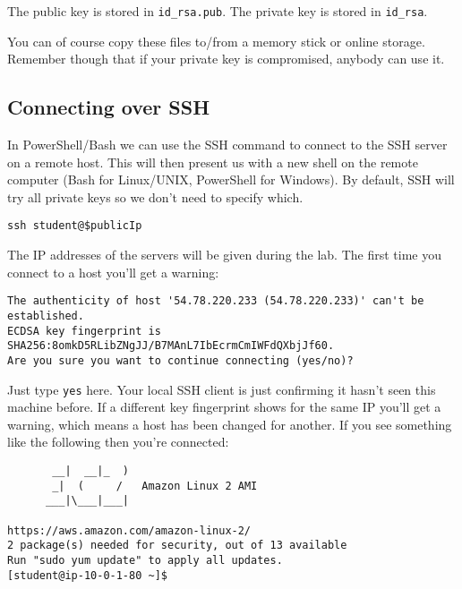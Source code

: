 \documentclass{pgnotes}
\begin{document}
The public key is stored in \texttt{id\_rsa.pub}.
The private key is stored in \texttt{id\_rsa}.

You can of course copy these files to/from a memory stick or online storage.
Remember though that if your private key is compromised,
anybody can use it.

\subsection{Connecting over SSH}
\label{connecting-over-ssh}

In PowerShell/Bash we can use the SSH command to connect to the SSH server on a remote host.
This will then present us with a new shell on the remote computer (Bash for Linux/UNIX, PowerShell for Windows).
By default, SSH will try all private keys so we don't need to specify which.

\begin{verbatim}
ssh student@$publicIp 
\end{verbatim}

The IP addresses of the servers will be given during the lab.
The first time you connect to a host you'll get a warning:

\begin{verbatim}
The authenticity of host '54.78.220.233 (54.78.220.233)' can't be established.
ECDSA key fingerprint is SHA256:8omkD5RLibZNgJJ/B7MAnL7IbEcrmCmIWFdQXbjJf60.
Are you sure you want to continue connecting (yes/no)?
\end{verbatim}

Just type \texttt{yes} here.
Your local SSH client is just confirming it hasn't seen this machine before.
If a different key fingerprint shows for the same IP you'll get a warning, which means a host has been changed for another.
If you see something like the following then you're connected:

\begin{verbatim}
       __|  __|_  )
       _|  (     /   Amazon Linux 2 AMI
      ___|\___|___|

https://aws.amazon.com/amazon-linux-2/
2 package(s) needed for security, out of 13 available
Run "sudo yum update" to apply all updates.
[student@ip-10-0-1-80 ~]$
\end{verbatim}
\end{document}
